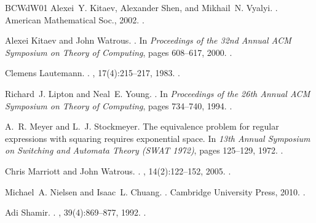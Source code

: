 \documentclass[10pt,a4paper]{article}
\theoremstyle{definition}
\newcommand{\class}[1]{\ensuremath{\mathsf{#1}}\xspace}
\newcommand{\BPP}{\class{BPP}}
\begin{document}
\begin{thebibliography}{BCWdW01}
Alexei~Y. Kitaev, Alexander Shen, and Mikhail~N. Vyalyi.
.
\newblock American Mathematical Soc., 2002.
\newblock \href {https://doi.org/10.1090/gsm/047} {}.

Alexei Kitaev and John Watrous.
.
\newblock In {\em Proceedings of the 32nd Annual ACM Symposium on Theory of
  Computing}, pages 608--617, 2000.
\newblock \href {https://doi.org/10.1145/335305.335387}
  {}.

Clemens Lautemann.
\newblock {$\BPP$ and the polynomial hierarchy}.
, 17(4):215--217, 1983.
\newblock \href {https://doi.org/10.1016/0020-0190(83)90044-3}
  {}.

Richard~J. Lipton and Neal~E. Young.
.
\newblock In {\em Proceedings of the 26th Annual ACM Symposium on Theory of
  Computing}, pages 734--740, 1994.
\newblock \href {https://doi.org/10.1145/195058.195447}
  {}.

A.~R. Meyer and L.~J. Stockmeyer.
\newblock The equivalence problem for regular expressions with squaring
  requires exponential space.
\newblock In {\em 13th Annual Symposium on Switching and Automata Theory (SWAT
  1972)}, pages 125--129, 1972.
\newblock \href {https://doi.org/10.1109/SWAT.1972.29}
  {}.

Chris Marriott and John Watrous.
.
, 14(2):122--152, 2005.
\newblock \href {https://doi.org/10.1007/s00037-005-0194-x}
  {}.

Michael~A. Nielsen and Isaac~L. Chuang.
.
\newblock Cambridge University Press, 2010.
\newblock \href {https://doi.org/10.1017/CBO9780511976667}
  {}.

Adi Shamir.
.
, 39(4):869–877, 1992.
\newblock \href {https://doi.org/10.1145/146585.146609}
  {}.


\end{thebibliography}
\end{document}
